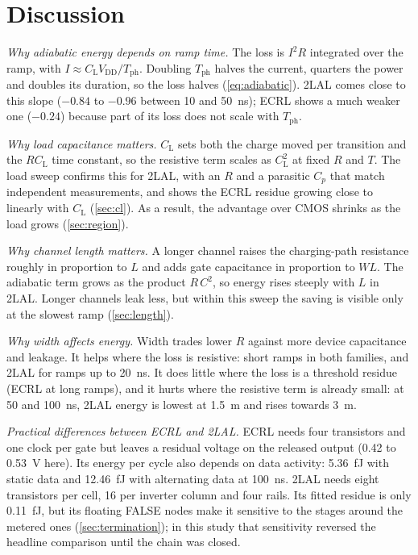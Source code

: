 \documentclass[conference]{IEEEtran}
\newcommand{\VDD}{V_{\mathrm{DD}}}
\newcommand{\CL}{C_{\mathrm{L}}}
\newcommand{\Tph}{T_{\mathrm{ph}}}
\begin{document}
\section{Discussion}
\label{sec:discussion}
\emph{Why adiabatic energy depends on ramp time.} The loss is $I^2R$
integrated over the ramp, with $I\approx\CL\VDD/\Tph$. Doubling $\Tph$ halves
the current, quarters the power and doubles its duration, so the loss halves
(\cref{eq:adiabatic}). 2LAL comes close to this slope ($-0.84$ to $-0.96$
between 10 and 50~ns); ECRL shows a much weaker one ($-0.24$) because part of
its loss does not scale with $\Tph$.

\emph{Why load capacitance matters.} $\CL$ sets both the charge moved per
transition and the $R\CL$ time constant, so the resistive term scales as
$\CL^2$ at fixed $R$ and $T$. The load sweep confirms this for 2LAL, with an
$R$ and a parasitic $C_p$ that match independent measurements, and shows the
ECRL residue growing close to linearly with $\CL$ (\cref{sec:cl}). As a
result, the advantage over CMOS shrinks as the load grows
(\cref{sec:region}).

\emph{Why channel length matters.} A longer channel raises the
charging-path resistance roughly in proportion to $L$ \cite{fischer2004} and
adds gate capacitance in proportion to $WL$. The adiabatic term grows as the
product $R\,C^2$, so energy rises steeply with $L$ in 2LAL. Longer channels
leak less, but within this sweep the saving is visible only at the slowest
ramp (\cref{sec:length}).

\emph{Why width affects energy.} Width trades lower $R$ against more device
capacitance and leakage. It helps where the loss is resistive: short ramps
in both families, and 2LAL for ramps up to 20~ns. It does little where the
loss is a threshold residue (ECRL at long ramps), and it hurts where the
resistive term is already small: at 50 and 100~ns, 2LAL energy is lowest at
1.5~\textmu m and rises towards 3~\textmu m.

\emph{Practical differences between ECRL and 2LAL.} ECRL needs four
transistors and one clock per gate but leaves a residual voltage on the
released output (0.42 to 0.53~V here). Its energy per cycle also depends on data activity:
5.36~fJ with static data and 12.46~fJ with alternating data at 100~ns. 2LAL
needs eight transistors per cell, 16 per inverter column and four rails. Its
fitted residue is only 0.11~fJ, but its floating FALSE nodes make it sensitive to the stages
around the metered ones (\cref{sec:termination}); in this study that
sensitivity reversed the headline comparison until the chain was closed.
\end{document}
